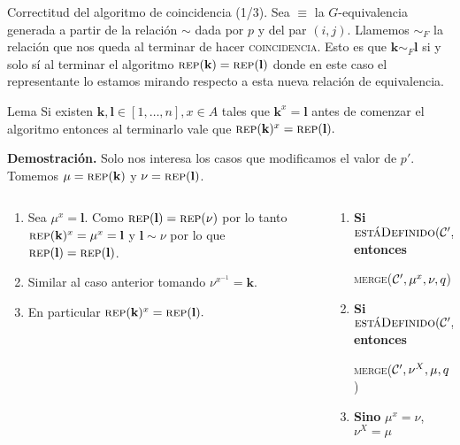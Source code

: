 \documentclass[aspectratio=169, 9pt]{beamer}
\newcommand{\rep}{\textsc{rep}}
\newcommand{\coin}{\textsc{coincidencia}}
\newcommand{\mer}{\textsc{merge}}
\newcommand{\edeff}{\textsc{estáDefinido}}
\newcommand{\Co}{{\cal{C}}}
\begin{document}
\begin{frame}[fragile]{Correctitud del algoritmo de coincidencia (1/3).}
	Sea $\equiv$ la $G$-equivalencia generada a partir de la relación $\sim$ dada por $p$ y del par $(i, j)$.
	\pause
	Llamemos $\sim_F$ la relación que nos queda al terminar de hacer \coin.
	Esto es que $\textbf{k} \sim_F \textbf{l}$ si y solo sí al terminar el algoritmo $\rep (\textbf{k}) = \rep(\textbf{l})$ donde en este caso el representante lo estamos mirando respecto a esta nueva relación de equivalencia.
	\pause
	
	\begin{alertblock}{Lema}
		Si existen $\textbf{k}, \textbf{l} \in [1,\dots,n], x \in A$ tales que $\textbf{k}^x = \textbf{l}$ antes de comenzar el algoritmo entonces al terminarlo vale que $\rep(\textbf{k})^x = \rep(\textbf{l}).$
	\end{alertblock}
	\pause
	\textbf{Demostración.} 
	\pause
	Solo nos interesa los casos que modificamos el valor de $p'$. 
	Tomemos $\mu = \rep(\textbf{k}) $ y $\nu = \rep(\textbf{l})$.
	\pause
	\begin{columns}
		\begin{column}{0.5\textwidth}
			\begin{enumerate}
				\item Sea $\mu^x = \textbf{l}$. 
				Como $\rep (\textbf{l}) = \rep (\nu)$ por lo tanto $\rep(\textbf{k})^x = \mu^x = \textbf{l} $ y $\textbf{l} \sim \nu $ por lo que $ \rep(\textbf{l}) = \rep (\textbf{l})$.
				\item Similar al caso anterior tomando $\nu^{x^{-1}} = \textbf{k}$.
				\item En particular $\rep(\textbf{k})^x = \rep(\textbf{l}).$
			\end{enumerate}
		\end{column}
		\begin{column}{0.5\textwidth}  %
			\begin{enumerate}
				\item  \textbf{Si} $\edeff(\Co', \mu, x)$ \textbf{entonces}
				
				 \mer($\Co', \mu^x, \nu, q$) 
				\item  \textbf{Si} $\edeff(\Co', \nu, X)$  \textbf{entonces}
				
				  \mer($\Co', \nu^X, \mu, q$)
				\item \textbf{Sino} $\mu^x = \nu$, $\nu^X = \mu$ 
			\end{enumerate}
		\end{column}
	\end{columns}
\end{frame}
\end{document}
